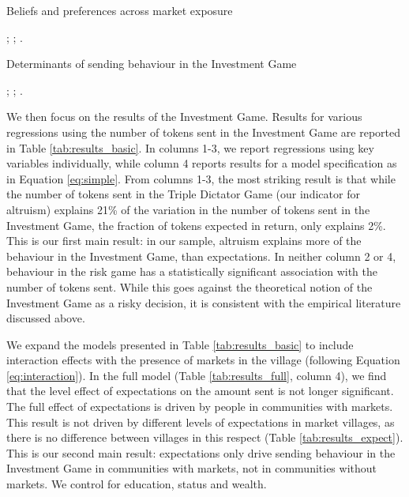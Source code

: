 \begin{threeparttable}[p!]
	\small
	\caption{Beliefs and preferences across market exposure}
	\label{tab:results_expect}
	\centering
	
	\begin{tablenotes}
		\footnotesize
		\item \camsig; \camcluster; \camcontrols.
		\item
	\end{tablenotes}
\end{threeparttable}


\begin{threeparttable}[p!]
	\centering
	\small

	\caption{Determinants of sending behaviour in the Investment Game}
	\label{tab:results_basic}
	
	
	\begin{tablenotes}
		\footnotesize
		\item \camsig; \camcluster; \camcontrols.
		\item
	\end{tablenotes}
\end{threeparttable}

We then focus on the results of the Investment Game. Results for various regressions using the number of tokens sent in the Investment Game are reported in Table \ref{tab:results_basic}. In columns 1-3, we report regressions using key variables individually, while column 4 reports results for a model specification as in Equation \ref{eq:simple}. From columns 1-3, the most striking result is that while the number of tokens sent in the Triple Dictator Game (our indicator for altruism) explains 21\% of the variation in the number of tokens sent in the Investment Game, the fraction of tokens expected in return, only explains 2\%. This is our first main result: in our sample, altruism explains more of the behaviour in the Investment Game, than expectations. In neither column 2 or 4, behaviour in the risk game has a statistically significant association with the number of tokens sent. While this goes against the theoretical notion of the Investment Game as a risky decision, it is consistent with the empirical literature discussed above.

We expand the models presented in Table \ref{tab:results_basic} to include interaction effects with the presence of markets in the village (following Equation \ref{eq:interaction}). In the full model (Table \ref{tab:results_full}, column 4), we find that the level effect of expectations on the amount sent is not longer significant. The full effect of expectations is driven by people in communities with markets. This result is not driven by different levels of expectations in market villages, as there is no difference between villages in this respect (Table \ref{tab:results_expect}). This is our second main result: expectations only drive sending behaviour in the Investment Game in communities with markets, not in communities without markets. We control for education, status and wealth.

